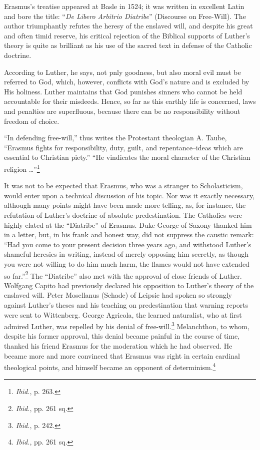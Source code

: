 Erasmus’s treatise appeared at Basle in 1524; it was written in
excellent Latin and bore the title: “\textit{De Libero Arbitrio Diatribe}”
(Discourse on Free-Will). The author triumphantly refutes the
heresy of the enslaved will, and despite his great and often timid
reserve, his critical rejection of the Biblical supports of Luther’s
theory is quite as brilliant as his use of the sacred text in defense
of the Catholic doctrine.

According to Luther, he says, not pnly goodness, but also moral evil must
be referred to God, which, however, conflicts with God’s nature and is excluded
by His holiness. Luther maintains that God punishes sinners who
cannot be held accountable for their misdeeds. Hence, so far as this earthly
life is concerned, laws and penalties are superfluous, because there can be
no responsibility without freedom of choice.

“In defending free-will,” thus writes the Protestant theologian A. Taube,
“Erasmus fights for responsibility, duty, guilt, and repentance--ideas which
are essential to Christian piety.” “He vindicates the moral character of the
Christian religion \dots''\footnote{\textit{Ibid.}, p. 263.}

It was not to be expected that Erasmus, who was a stranger to
Scholasticism, would enter upon a technical discussion of his topic.
Nor was it exactly necessary, although many points might have been
made more telling, as, for instance, the refutation of Luther’s doctrine
of absolute predestination. The Catholics were highly elated at the
“Diatribe” of Erasmus. Duke George of Saxony thanked him in
a letter, but, in his frank and honest way, did not suppress the caustic
remark: “Had you come to your present decision three years ago,
and withstood Luther’s shameful heresies in writing, instead of merely
opposing him secretly, as though you were not willing to do him
much harm, the flames would not have extended so far.”\footnote
{\textit{Ibid.}, pp. 261 sq.}
The
“Diatribe” also met with the approval of close friends of Luther.
Wolfgang Capito had previously declared his opposition to Luther’s
theory of the enslaved will. Peter Mosellanus (Schade) of Leipsic
had spoken so strongly against Luther’s theses and his teaching on
predestination that warning reports were sent to Wittenberg. George
Agricola, the learned naturalist, who at first admired Luther, was
repelled by his denial of free-will.\footnote{\textit{Ibid.}, p. 242.}
Melanchthon, to whom, despite
his former approval, this denial became painful in the course of time,
thanked his friend Erasmus for the moderation which he had observed.
He became more and more convinced that Erasmus was right in
certain cardinal theological points, and himself became an opponent
of determinism.\footnote{\textit{Ibid.}, pp. 261 sq.}

